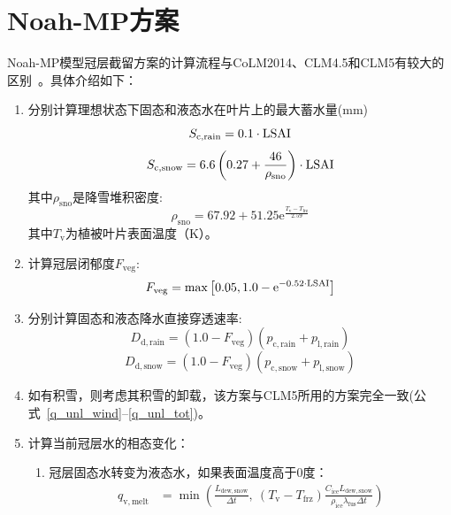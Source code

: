 \section{Noah-MP方案}
Noah-MP模型冠层截留方案的计算流程与CoLM2014、CLM4.5和CLM5有较大的区别~\citep{niu2011community,he2023modernizing}。具体介绍如下：
\begin{enumerate}
  \item 分别计算理想状态下固态和液态水在叶片上的最大蓄水量(mm)\\
    \begin{equation}
      S_{\mathrm{c,rain}}=0.1\cdot{\rm LSAI}\\
    \end{equation}
    \begin{equation}
      S_{\mathrm{c,snow}}= 6.6\left(0.27+{\frac{46}{\rho_{\mathrm{sno}}}}\right) \cdot{\rm LSAI}
    \end{equation}
    其中$\rho_{\mathrm{sno}}$是降雪堆积密度:
    \begin{equation}
      \rho_{\mathrm{sno}}=67.92+51.25 {\mathrm e}^{\frac{T_{\mathrm{v}}-T_{\mathrm{frz}}}{2.59}}
    \end{equation}
其中$T_{\mathrm{v}}$为植被叶片表面温度（K）。
  \item 计算冠层闭郁度$F_{\mathrm{veg}}$:
    \begin{equation}
      F_{\mathrm{veg}} = \max\left[0.05,1.0-{\mathrm e}^{-0.52\cdot{\rm LSAI}}\right]
    \end{equation}
  \item 分别计算固态和液态降水直接穿透速率:
    \begin{equation}
      D_{\mathrm{d,rain}}=\left(1.0-F_{\mathrm{veg}}\right)  (p_{\mathrm{c,rain}}+p_{\mathrm{l,rain}})
    \end{equation}
    \begin{equation}
      D_{\mathrm{d,snow}}=\left(1.0-F_{\mathrm{veg}}\right)  (p_{\mathrm{c,snow}}+p_{\mathrm{l,snow}})
    \end{equation}
  \item 如有积雪，则考虑其积雪的卸载，该方案与CLM5所用的方案完全一致(公式~\eqref{q_unl_wind}--\eqref{q_unl_tot})。
  \item 计算当前冠层水的相态变化：
    \begin{enumerate}
      \item 冠层固态水转变为液态水，如果表面温度高于0度：
        \begin{equation}
          \begin{aligned}
            q_{\mathrm{v, melt}} &=\min \left(\frac{L_{\mathrm{dew,snow}}}{\Delta t},\ \left(T_{\mathrm{v}}-T_{\mathrm{frz}}\right)  \frac{C_{\mathrm{ice}}  L_{\mathrm{dew,snow}}}{\rho_{\mathrm{i c e}}  \lambda_{\mathrm{fus}}  \Delta t}\right) \\

\end{aligned}
\end{equation}
\end{enumerate}
\end{enumerate}
